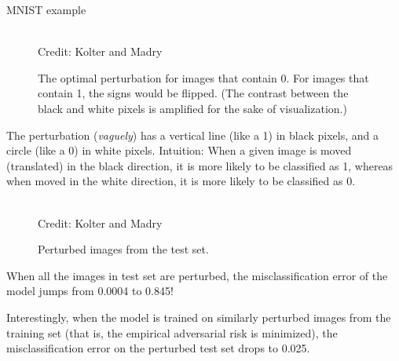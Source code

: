 \begin{vbframe} {MNIST example}
\begin{itemize}
\begin{figure}
      \tiny{\\Credit: Kolter and Madry}
      \caption{The optimal perturbation for images that contain 0. For images that contain 1, the signs would be flipped. (The contrast between the black and white pixels is amplified for the sake of visualization.) }
    \end{figure}
    \item The perturbation (\textit{vaguely}) has a vertical line (like a 1) in black pixels, and a circle (like a 0) in white pixels. Intuition: When a given image is moved (translated) in the black direction, it is more likely to be classified as 1, whereas when moved in the white direction, it is more likely to be classified as 0.
 
    \framebreak
    
    \begin{figure}
    \centering
    \captionsetup{font=footnotesize,labelfont=footnotesize, labelfont = bf}
      \tiny{\\Credit: Kolter and Madry}
      \caption{Perturbed images from the test set.}
    \end{figure}
    
      \item \small{When all the images in test set are perturbed, the misclassification error of the model jumps from 0.0004 to 0.845!
      \item Interestingly, when the model is trained on similarly perturbed images from the training set (that is, the empirical adversarial risk is minimized), the misclassification error on the perturbed test set drops to 0.025.}
    \end{itemize}
    \framebreak
  

\end{vbframe}
